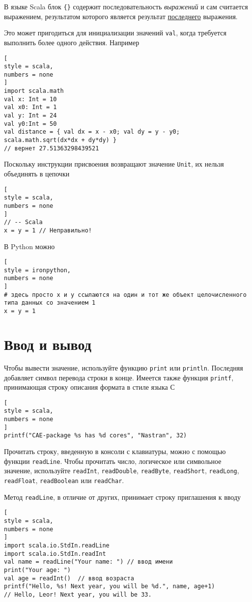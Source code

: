 \documentclass[%
	11pt,
	a4paper,
	utf8,
		]{article}
\begin{document}
В языке Scala блок \verb|{}| содержит последовательность \emph{выражений} и сам считается выражением, результатом которого является результат \underline{последнего} выражения.

Это может пригодиться для инициализации значений \texttt{val}, когда требуется выполнить более одного действия. Например
\begin{lstlisting}[
style = scala,
numbers = none
]
import scala.math
val x: Int = 10
val x0: Int = 1
val y: Int = 24
val y0:Int = 50
val distance = { val dx = x - x0; val dy = y - y0; scala.math.sqrt(dx*dx + dy*dy) }
// вернет 27.51363298439521
\end{lstlisting}

Поскольку инструкции присвоения возвращают значение \texttt{Unit}, их нельзя объединять в цепочки
\begin{lstlisting}[
style = scala,
numbers = none
]
// -- Scala
x = y = 1 // Неправильно!
\end{lstlisting}

В Python можно
\begin{lstlisting}[
style = ironpython,
numbers = none
]
# здесь просто x и y ссылаются на один и тот же объект целочисленного типа данных со значением 1
x = y = 1
\end{lstlisting}

\section{Ввод и вывод}

Чтобы вывести значение, используйте функцию \texttt{print} или \texttt{println}. Последняя добавляет символ перевода строки в конце. Имеется также функция \texttt{printf}, принимающая строку описания формата в стиле языка С
\begin{lstlisting}[
style = scala,
numbers = none
]
printf("CAE-package %s has %d cores", "Nastran", 32)
\end{lstlisting}

Прочитать строку, введенную в консоли с клавиатуры, можно с помощью функции \texttt{readLine}. Чтобы прочитать число, логическое или символьное значение, используйте \texttt{readInt}, \texttt{readDouble}, \texttt{readByte}, \texttt{readShort}, \texttt{readLong}, \texttt{readFloat}, \texttt{readBoolean} или \texttt{readChar}.

Метод \texttt{readLine}, в отличие от других, принимает строку приглашения к вводу
\begin{lstlisting}[
style = scala,
numbers = none
]
import scala.io.StdIn.readLine
import scala.io.StdIn.readInt
val name = readLine("Your name: ") // ввод имени
print("Your age: ")
val age = readInt()  // ввод возраста
printf("Hello, %s! Next year, you will be %d.", name, age+1)
// Hello, Leor! Next year, you will be 33.
\end{lstlisting}
\end{document}
